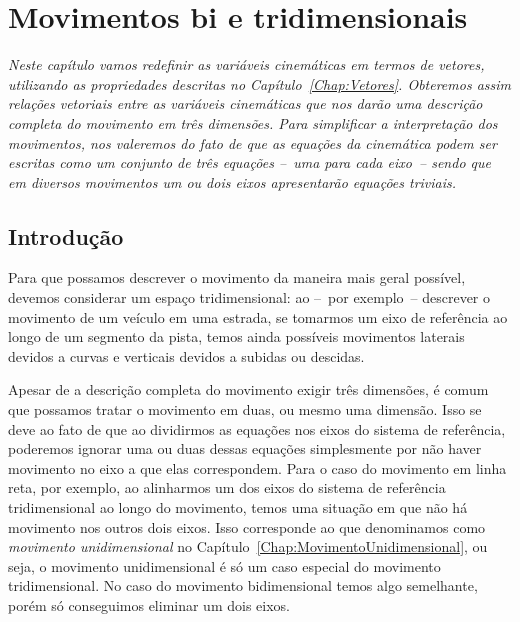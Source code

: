 \chapter{Movimentos bi e tridimensionais}
\label{Chap:MovimentoBidimensional}


\begin{fullwidth}
{\it
Neste capítulo vamos redefinir as variáveis cinemáticas em termos de vetores, utilizando as propriedades descritas no Capítulo~\ref{Chap:Vetores}. Obteremos assim relações vetoriais entre as variáveis cinemáticas que nos darão uma descrição completa do movimento em três dimensões. Para simplificar a interpretação dos movimentos, nos valeremos do fato de que as equações da cinemática podem ser escritas como um conjunto de três equações --~uma para cada eixo~-- sendo que em diversos movimentos um ou dois eixos apresentarão equações triviais.
}
\end{fullwidth}

\section{Introdução}

Para que possamos descrever o movimento da maneira mais geral possível, devemos considerar um espaço tridimensional: ao --~por exemplo~-- descrever o movimento de um veículo em uma estrada, se tomarmos um eixo de referência ao longo de um segmento da pista, temos ainda possíveis movimentos laterais devidos a curvas e verticais devidos a subidas ou descidas.

Apesar de a descrição completa do movimento exigir três dimensões, é comum que possamos tratar o movimento em duas, ou mesmo uma dimensão. Isso se deve ao fato de que ao dividirmos as equações nos eixos do sistema de referência, poderemos ignorar uma ou duas dessas equações simplesmente por não haver movimento no eixo a que elas correspondem. Para o caso do movimento em linha reta, por exemplo, ao alinharmos um dos eixos do sistema de referência tridimensional ao longo do movimento, temos uma situação em que não há movimento nos outros dois eixos. Isso corresponde ao que denominamos como \emph{movimento unidimensional} no Capítulo~\ref{Chap:MovimentoUnidimensional}, ou seja, o movimento unidimensional é só um caso especial do movimento tridimensional. No caso do movimento bidimensional temos algo semelhante, porém só conseguimos eliminar um dois eixos.

